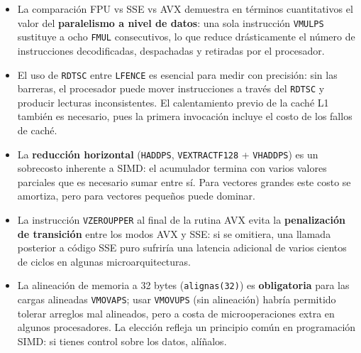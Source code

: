 \documentclass[12pt, letterpaper]{article}
\begin{document}
\begin{itemize}
    \item La comparación FPU vs SSE vs AVX demuestra en términos cuantitativos el valor del \textbf{paralelismo a nivel de datos}: una sola instrucción \texttt{VMULPS} sustituye a ocho \texttt{FMUL} consecutivos, lo que reduce drásticamente el número de instrucciones decodificadas, despachadas y retiradas por el procesador.

    \item El uso de \texttt{RDTSC} entre \texttt{LFENCE} es esencial para medir con precisión: sin las barreras, el procesador puede mover instrucciones a través del \texttt{RDTSC} y producir lecturas inconsistentes. El calentamiento previo de la caché L1 también es necesario, pues la primera invocación incluye el costo de los fallos de caché.

    \item La \textbf{reducción horizontal} (\texttt{HADDPS}, \texttt{VEXTRACTF128} + \texttt{VHADDPS}) es un sobrecosto inherente a SIMD: el acumulador termina con varios valores parciales que es necesario sumar entre sí. Para vectores grandes este costo se amortiza, pero para vectores pequeños puede dominar.

    \item La instrucción \texttt{VZEROUPPER} al final de la rutina AVX evita la \textbf{penalización de transición} entre los modos AVX y SSE: si se omitiera, una llamada posterior a código SSE puro sufriría una latencia adicional de varios cientos de ciclos en algunas microarquitecturas.

    \item La alineación de memoria a 32 bytes (\texttt{alignas(32)}) es \textbf{obligatoria} para las cargas alineadas \texttt{VMOVAPS}; usar \texttt{VMOVUPS} (sin alineación) habría permitido tolerar arreglos mal alineados, pero a costa de microoperaciones extra en algunos procesadores. La elección refleja un principio común en programación SIMD: si tienes control sobre los datos, alíñalos.
\end{itemize}
\end{document}
